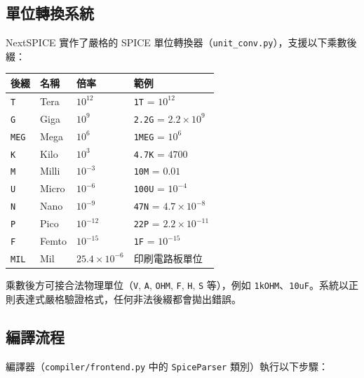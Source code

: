 \documentclass[12pt,a4paper]{article}
\begin{document}
\subsection{單位轉換系統}

NextSPICE 實作了嚴格的 SPICE 單位轉換器（\texttt{unit\_conv.py}），支援以下乘數後綴：

\begin{center}
\begin{tabular}{llll}
\toprule
\textbf{後綴} & \textbf{名稱} & \textbf{倍率} & \textbf{範例} \\
\midrule
\texttt{T}   & Tera  & $10^{12}$   & \texttt{1T} = $10^{12}$ \\
\texttt{G}   & Giga  & $10^{9}$    & \texttt{2.2G} = $2.2\times10^{9}$ \\
\texttt{MEG} & Mega  & $10^{6}$    & \texttt{1MEG} = $10^{6}$ \\
\texttt{K}   & Kilo  & $10^{3}$    & \texttt{4.7K} = $4700$ \\
\texttt{M}   & Milli & $10^{-3}$   & \texttt{10M} = $0.01$ \\
\texttt{U}   & Micro & $10^{-6}$   & \texttt{100U} = $10^{-4}$ \\
\texttt{N}   & Nano  & $10^{-9}$   & \texttt{47N} = $4.7\times10^{-8}$ \\
\texttt{P}   & Pico  & $10^{-12}$  & \texttt{22P} = $2.2\times10^{-11}$ \\
\texttt{F}   & Femto & $10^{-15}$  & \texttt{1F} = $10^{-15}$ \\
\texttt{MIL} & Mil   & $25.4\times10^{-6}$ & 印刷電路板單位 \\
\bottomrule
\end{tabular}
\end{center}

乘數後方可接合法物理單位（\texttt{V}, \texttt{A}, \texttt{OHM}, \texttt{F}, \texttt{H}, \texttt{S} 等），例如 \texttt{1kOHM}、\texttt{10uF}。系統以正則表達式嚴格驗證格式，任何非法後綴都會拋出錯誤。

\subsection{編譯流程}

編譯器（\texttt{compiler/frontend.py} 中的 \texttt{SpiceParser} 類別）執行以下步驟：
\end{document}
